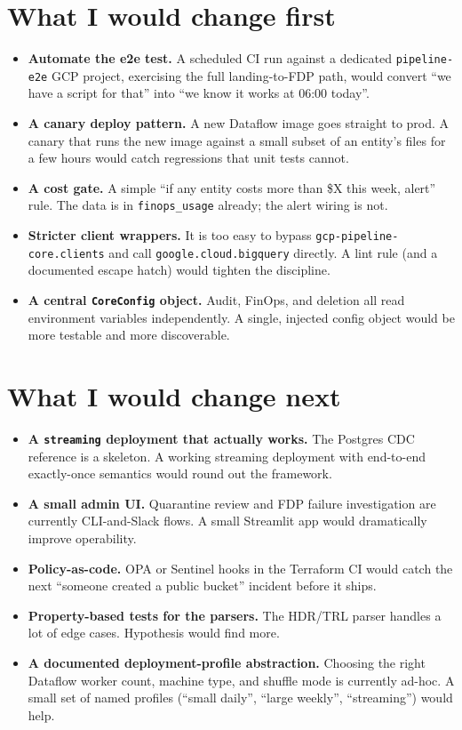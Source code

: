 \documentclass[
  11pt,
  british,
  oneside]{book}
\providecommand{\tightlist}{%
  \setlength{\itemsep}{0pt}\setlength{\parskip}{0pt}}
\begin{document}
\hypertarget{what-i-would-change-first}{%
\section{What I would change first}\label{what-i-would-change-first}}

\begin{itemize}
\tightlist
\item
  \textbf{Automate the e2e test.} A scheduled CI run against a dedicated
  \texttt{pipeline-e2e} GCP project, exercising the full landing-to-FDP
  path, would convert ``we have a script for that'' into ``we know it
  works at 06:00 today''.
\item
  \textbf{A canary deploy pattern.} A new Dataflow image goes straight
  to prod. A canary that runs the new image against a small subset of an
  entity's files for a few hours would catch regressions that unit tests
  cannot.
\item
  \textbf{A cost gate.} A simple ``if any entity costs more than \$X
  this week, alert'' rule. The data is in \texttt{finops\_usage}
  already; the alert wiring is not.
\item
  \textbf{Stricter client wrappers.} It is too easy to bypass
  \texttt{gcp-pipeline-core.clients} and call
  \texttt{google.cloud.bigquery} directly. A lint rule (and a documented
  escape hatch) would tighten the discipline.
\item
  \textbf{A central \texttt{CoreConfig} object.} Audit, FinOps, and
  deletion all read environment variables independently. A single,
  injected config object would be more testable and more discoverable.
\end{itemize}

\hypertarget{what-i-would-change-next}{%
\section{What I would change next}\label{what-i-would-change-next}}

\begin{itemize}
\tightlist
\item
  \textbf{A \texttt{streaming} deployment that actually works.} The
  Postgres CDC reference is a skeleton. A working streaming deployment
  with end-to-end exactly-once semantics would round out the framework.
\item
  \textbf{A small admin UI.} Quarantine review and FDP failure
  investigation are currently CLI-and-Slack flows. A small Streamlit app
  would dramatically improve operability.
\item
  \textbf{Policy-as-code.} OPA or Sentinel hooks in the Terraform CI
  would catch the next ``someone created a public bucket'' incident
  before it ships.
\item
  \textbf{Property-based tests for the parsers.} The HDR/TRL parser
  handles a lot of edge cases. Hypothesis would find more.
\item
  \textbf{A documented deployment-profile abstraction.} Choosing the
  right Dataflow worker count, machine type, and shuffle mode is
  currently ad-hoc. A small set of named profiles (``small daily'',
  ``large weekly'', ``streaming'') would help.
\end{itemize}
\end{document}
